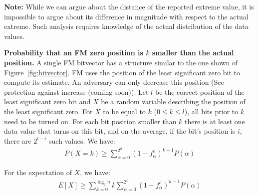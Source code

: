 \documentclass[10pt,twocolumn]{style}
\begin{document}
  {\bf Note:} While we can argue about the distance of the reported
  extreme value, it is impossible to argue about its difference in
  magnitude with respect to the actual extreme. Such analysis requires
  knowledge of the actual distribution of the data values.

  {\bf Probability that an FM zero position is $k$ smaller than the
  actual position.} A single FM bitvector has a structure similar to the one
  shown of Figure~\ref{fig:bitvector}. FM uses the position of the
  least significant zero bit to compute its estimate. An adversary can
  only decrease this position (See protection against increase (coming
  soon)). Let $l$ be the correct position of the least significant
  zero bit and $X$ be a random variable describing the position of the
  least significant zero. For $X$ to be equal to $k$ ($0\leq k \leq l$), all
  bits prior to $k$ need to be turned on. For each bit position smaller than $k$ there is at least one data
  value that turns on this bit, and on the average, if the bit's
  position is $i$, there are $2^{l-i}$ such values. We have:
  \begin{eqnarray}
    P(X=k) \geq \sum_{\alpha=0}^{2^h}(1-f_{\alpha}^c)^{k-1}P(\alpha)
  \end{eqnarray}

  For the expectation of $X$, we have:
  \begin{eqnarray}
    E[X] \geq \sum_{k=0}^{\log_2{n}}k\sum_{\alpha=0}^{2^h}(1-f_{\alpha}^c)^{k-1}P(\alpha)
  \end{eqnarray}



  

\end{document}
